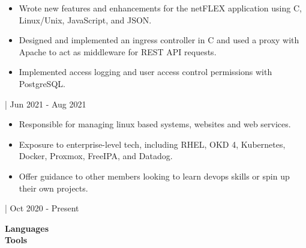 \documentclass[11pt,letterpaper,ragged2e]{altacv}
\begin{document}


\begin{fullwidth}
\makecvheader
\end{fullwidth}




{
\begin{itemize}
    \item Wrote new features and enhancements for the netFLEX application using C, Linux/Unix, JavaScript, and JSON.
    \item Designed and implemented an ingress controller in C and used a proxy with Apache to act as middleware for REST API requests.
    \item Implemented access logging and user access control permissions with PostgreSQL. 
\end{itemize}
}
{| Jun 2021 - Aug 2021} \

{
\begin{itemize}
    \item Responsible for managing linux based systems, websites and web services.
    \item Exposure to enterprise-level tech, including RHEL, OKD 4, Kubernetes, Docker, Proxmox, FreeIPA, and Datadog.
    \item Offer guidance to other members looking to learn devops skills or spin up their own projects.
\end{itemize}
}
{| Oct 2020 - Present} \

\bf Languages \\
\medskip
\bf Tools \\


 \

\clearpage

\nocite{*}
\end{document}
